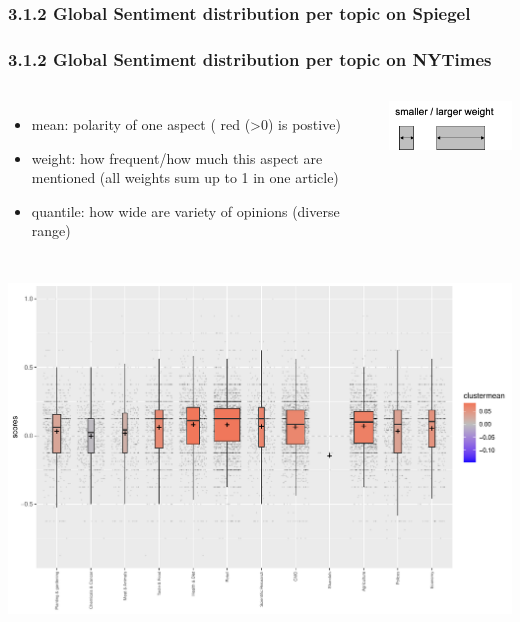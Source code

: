 \documentclass{tum-presentation}
\begin{document}
\subsubsection{3.1.2 Global Sentiment distribution per topic on Spiegel}
\begin{frame}
  
 
  \frametitle{3.1.2 Global Sentiment distribution per topic on NYTimes}
  \begin{columns}
    \begin{minipage}[c]{\linewidth}
      \begin{itemize}
        \item mean:  polarity of one aspect ( red (>0) is postive)
        \item weight: how frequent/how much this aspect are mentioned (all weights sum up to 1 in one article)
        \item quantile: how wide are variety of opinions (diverse range)
     \end{itemize}
  \end{minipage}
  \begin{minipage}[c]{\linewidth}
  \includegraphics[width=0.6\linewidth]{figures/legend.pdf}
\end{minipage}
  \end{columns}
  \begin{columns}
    \begin{minipage}[c]{\linewidth}
        \centering
        \includegraphics[width=\linewidth]{figures/all_boxplot_all_sentiments_nytimes_news.pdf}
    \end{minipage}
    \begin{minipage}[c]{\linewidth}
     

\end{minipage}
\end{columns}
\end{frame}
\end{document}
